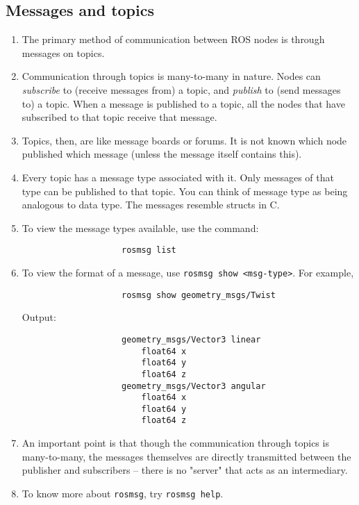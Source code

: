 \documentclass{article}
\begin{document}
        \subsection{Messages and topics}
            \begin{enumerate}
                \item The primary method of communication between ROS nodes is through messages on topics.
                \item Communication through topics is many-to-many in nature. Nodes can \emph{subscribe} to (receive messages from) a topic,
                and \emph{publish} to (send messages to) a topic. When a message is published to a topic, all the nodes that have subscribed to that 
                topic receive that message.
                \item Topics, then, are like message boards or forums. It is not known which node published which message (unless the message itself contains this).
                \item Every topic has a message type associated with it. Only messages of that type can be published to that topic. You can think of message type as being analogous to data type.
                The messages resemble structs in C.
                \item To view the message types available, use the command:
                \begin{verbatim}
                    rosmsg list
                \end{verbatim}
                \item To view the format of a message, use \texttt{rosmsg show <msg-type>}. For example,
                \begin{verbatim}
                    rosmsg show geometry_msgs/Twist
                \end{verbatim}
                Output:
                \begin{verbatim}
                    geometry_msgs/Vector3 linear
                        float64 x
                        float64 y
                        float64 z
                    geometry_msgs/Vector3 angular
                        float64 x
                        float64 y
                        float64 z
                \end{verbatim}
                \item An important point is that though the communication through topics is many-to-many,
                the messages themselves are directly transmitted between the publisher and subscribers
                 -- there is no "server" that acts as an intermediary.
                
                \item To know more about \texttt{rosmsg}, try \texttt{rosmsg help}.
            \end{enumerate}
\end{document}
